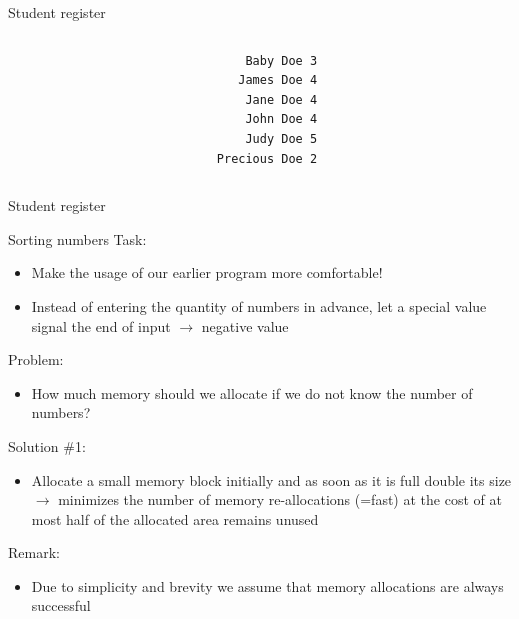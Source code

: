 \documentclass[usenames,dvipsnames,aspectratio=169]{beamer}
\begin{document}
\begin{frame}[fragile]{Student register}
  \begin{columns}[T]
    \begin{column}{0.7\textwidth}
      \footnotesize
      \begin{exampleblock}{}
        
      \end{exampleblock}          
    \end{column}
    \begin{column}{0.25\textwidth}
  \begin{verbatim}
    Baby Doe 3
   James Doe 4
    Jane Doe 4
    John Doe 4
    Judy Doe 5
Precious Doe 2 
\end{verbatim}          
    \end{column}
  \end{columns}
\end{frame}

\begin{frame}{Student register}
  \begin{exampleblock}{}
    
  \end{exampleblock}
\end{frame}

\begin{frame}{Sorting numbers}
  \small
  Task:
  \begin{itemize}
    \item Make the usage of our earlier program more comfortable! 
    \item Instead of entering the quantity of numbers in advance, let a special value signal the end of input $\to$ negative value
  \end{itemize}
  Problem:
  \begin{itemize}
    \item[] How much memory should we allocate if we do not know the number of numbers?
  \end{itemize}
  Solution \#1:
  \begin{itemize}
    \item[] Allocate a small memory block initially and as soon as it is full double its size $\to$ minimizes the number of memory re-allocations (=fast) at the cost of at most half of the allocated area remains unused
  \end{itemize}
  Remark:
  \begin{itemize}
    \item[] Due to simplicity and brevity we assume that memory allocations are always successful
  \end{itemize}
\end{frame}
\end{document}
